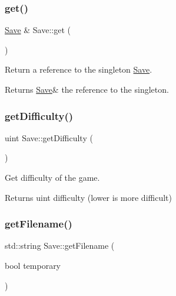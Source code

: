 \subsubsection{\texorpdfstring{get()}{get()}}
{\footnotesize\ttfamily \hyperlink{class_save}{Save} \& Save\+::get (\begin{DoxyParamCaption}{ }\end{DoxyParamCaption})\hspace{0.3cm}{\ttfamily [static]}}



Return a reference to the singleton \hyperlink{class_save}{Save}. 

\begin{DoxyReturn}{Returns}
\hyperlink{class_save}{Save}\& the reference to the singleton. 
\end{DoxyReturn}
\mbox{\label{class_save_acc628465cba884e99fea348066c1eec9}} 
\subsubsection{\texorpdfstring{get\+Difficulty()}{getDifficulty()}}
{\footnotesize\ttfamily uint Save\+::get\+Difficulty (\begin{DoxyParamCaption}{ }\end{DoxyParamCaption})\hspace{0.3cm}{\ttfamily [static]}}



Get difficulty of the game. 

\begin{DoxyReturn}{Returns}
uint difficulty (lower is more difficult) 
\end{DoxyReturn}
\mbox{\label{class_save_ac33997c07a1209006b6b7edbcc6673a1}} 
\subsubsection{\texorpdfstring{get\+Filename()}{getFilename()}}
{\footnotesize\ttfamily std\+::string Save\+::get\+Filename (\begin{DoxyParamCaption}\item[{bool}]{temporary }\end{DoxyParamCaption})\hspace{0.3cm}{\ttfamily [static]}}



